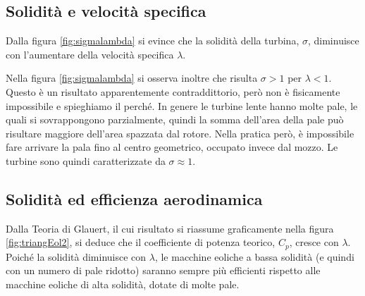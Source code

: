 \subsection{Solidità e velocità specifica}
Dalla figura \ref{fig:sigmalambda} si evince che la solidità della turbina, $\sigma$, diminuisce con l'aumentare della velocità specifica $\lambda$. 

Nella figura \ref{fig:sigmalambda} si osserva inoltre che risulta $\sigma > 1$ per $\lambda < 1$. Questo è un risultato apparentemente contraddittorio, però non è fisicamente impossibile e spieghiamo il perché. In genere le turbine lente hanno molte pale, le quali si sovrappongono parzialmente, quindi la somma dell'area della pale può risultare maggiore dell'area spazzata dal rotore. Nella pratica però, è impossibile fare arrivare la pala fino al centro geometrico, occupato invece dal mozzo. Le turbine sono quindi caratterizzate da $\sigma \approx 1$. 

\subsection{Solidità ed efficienza aerodinamica}
Dalla Teoria di Glauert, il cui risultato si riassume graficamente nella figura \ref{fig:triangEol2}, si deduce che il coefficiente di potenza teorico, $C_p$, cresce con $\lambda$. Poiché la solidità diminuisce con $\lambda$, le macchine eoliche a bassa solidità (e quindi con un numero di pale ridotto) saranno sempre più efficienti rispetto alle macchine eoliche di alta solidità, dotate di molte pale. 

